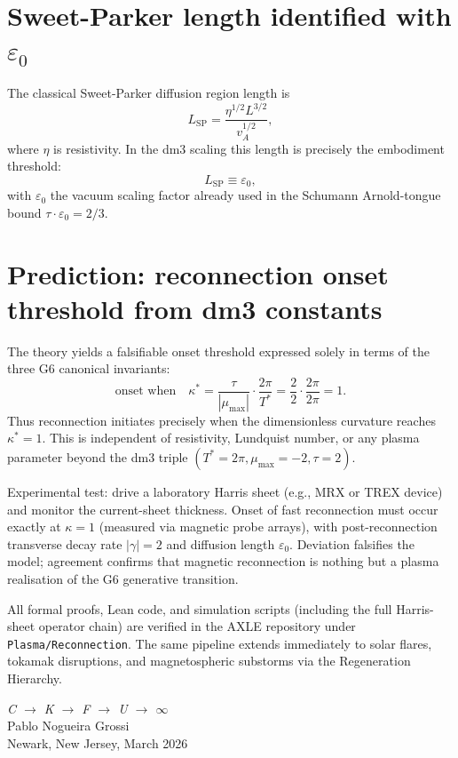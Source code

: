 \documentclass[19pt]{book}
\theoremstyle{plain}
\theoremstyle{definition}
\theoremstyle{remark}
\begin{document}
\section{Sweet-Parker length identified with \(\varepsilon_0\)}

The classical Sweet-Parker diffusion region length is
\[
L_{\text{SP}} = \frac{\eta^{1/2} L^{3/2}}{v_A^{1/2}},
\]
where \(\eta\) is resistivity. In the dm3 scaling this length is precisely the embodiment threshold:
\[
L_{\text{SP}} \equiv \varepsilon_0,
\]
with \(\varepsilon_0\) the vacuum scaling factor already used in the Schumann Arnold-tongue bound \(\tau\cdot\varepsilon_0 = 2/3\).

\section{Prediction: reconnection onset threshold from dm3 constants}

The theory yields a falsifiable onset threshold expressed solely in terms of the three G6 canonical invariants:
\[
\text{onset when}\quad \kappa^* = \frac{\tau}{|\mu_{\max}|} \cdot \frac{2\pi}{T^*} = \frac{2}{2} \cdot \frac{2\pi}{2\pi} = 1.
\]
Thus reconnection initiates precisely when the dimensionless curvature reaches \(\kappa^* = 1\). This is independent of resistivity, Lundquist number, or any plasma parameter beyond the dm3 triple \((T^*=2\pi, \mu_{\max}=-2, \tau=2)\).

Experimental test: drive a laboratory Harris sheet (e.g., MRX or TREX device) and monitor the current-sheet thickness. Onset of fast reconnection must occur exactly at \(\kappa = 1\) (measured via magnetic probe arrays), with post-reconnection transverse decay rate \(|\gamma| = 2\) and diffusion length \(\varepsilon_0\). Deviation falsifies the model; agreement confirms that magnetic reconnection is nothing but a plasma realisation of the G6 generative transition.

All formal proofs, Lean code, and simulation scripts (including the full Harris-sheet operator chain) are verified in the AXLE repository under \texttt{Plasma/Reconnection}. The same pipeline extends immediately to solar flares, tokamak disruptions, and magnetospheric substorms via the Regeneration Hierarchy.
\bigskip
\begin{flushright}
\textit{C \;$\to$\; K \;$\to$\; F \;$\to$\; U \;$\to$\; $\infty$}\\[0.3em]
Pablo Nogueira Grossi\\
Newark, New Jersey, March 2026
\end{flushright}
\end{document}
